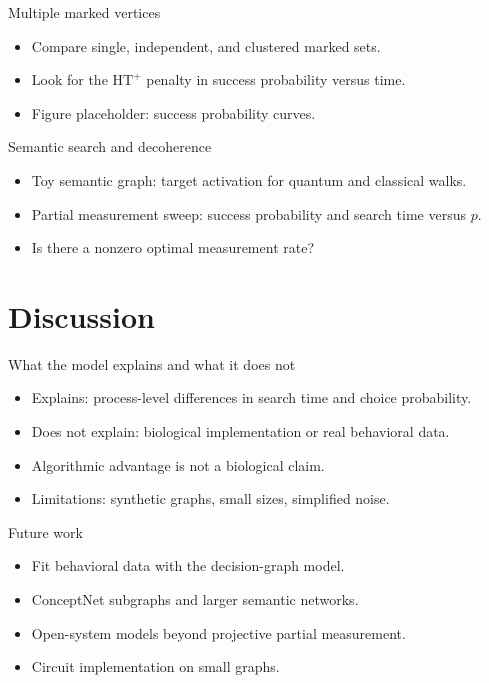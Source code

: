 \documentclass[aspectratio=169,11pt]{beamer}
\newcommand{\HTp}{\mathrm{HT}^{+}}
\begin{document}
\begin{frame}{Multiple marked vertices}
  \begin{itemize}
    \item Compare single, independent, and clustered marked sets.
    \item Look for the $\HTp$ penalty in success probability versus time.
    \item Figure placeholder: success probability curves.
  \end{itemize}
\end{frame}

\begin{frame}{Semantic search and decoherence}
  \begin{itemize}
    \item Toy semantic graph: target activation for quantum and classical walks.
    \item Partial measurement sweep: success probability and search time versus $p$.
    \item Is there a nonzero optimal measurement rate?
  \end{itemize}
\end{frame}

\section{Discussion}

\begin{frame}{What the model explains and what it does not}
  \begin{itemize}
    \item Explains: process-level differences in search time and choice probability.
    \item Does not explain: biological implementation or real behavioral data.
    \item Algorithmic advantage is not a biological claim.
    \item Limitations: synthetic graphs, small sizes, simplified noise.
  \end{itemize}
\end{frame}

\begin{frame}{Future work}
  \begin{itemize}
    \item Fit behavioral data with the decision-graph model.
    \item ConceptNet subgraphs and larger semantic networks.
    \item Open-system models beyond projective partial measurement.
    \item Circuit implementation on small graphs.
  \end{itemize}
\end{frame}
\end{document}
